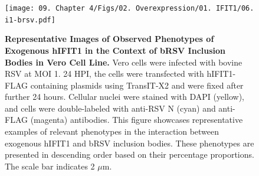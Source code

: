 \begin{figure}
    \centering
    \texttt{[image: 09. Chapter 4/Figs/02. Overexpression/01. IFIT1/06. i1-brsv.pdf]}
    \caption[Representative Images of Observed Phenotypes of Exogenous hIFIT1 in the Context of bRSV Inclusion Bodies in Vero Cell Line.]{\textbf{Representative Images of Observed Phenotypes of Exogenous hIFIT1 in the Context of bRSV Inclusion Bodies in Vero Cell Line.} Vero cells were infected with bovine RSV at MOI 1. 24 HPI, the cells were transfected with hIFIT1-FLAG containing plasmids using TransIT-X2 and were fixed after further 24 hours. Cellular nuclei were stained with DAPI (yellow), and cells were double-labeled with anti-RSV N (cyan) and anti-FLAG (magenta) antibodies. This figure showcases representative examples of relevant phenotypes in the interaction between exogenous hIFIT1 and bRSV inclusion bodies. These phenotypes are presented in descending order based on their percentage proportions. The scale bar indicates 2 \(\mu \mbox{m}\).}
    \label{fig:Representative Images of Observed Phenotypes of Exogenous hIFIT1 in the Context of bRSV Inclusion Bodies in VERO Cell Line}
\end{figure}

